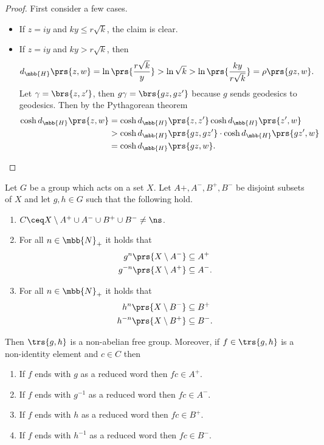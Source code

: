 \documentclass[10pt, twoside]{book}
\begin{document}
\begin{proof}
First consider a few cases.
\begin{itemize}
\item
If $z = iy$ and $ky \leq r \sqrt{k}$, the claim is clear.
\item
If $z = iy$ and $ky > r \sqrt{k}$, then \[d_{\mbb{H}}\prs{z,w} = \ln\prs{\frac{r\sqrt{k}}{y}} > \ln\sqrt{k} > \ln\prs{\frac{ky}{r \sqrt{k}}} = \rho\prs{gz, w} \text{.}\]
Let $\gamma = \brs{z,z'}$, then $g\gamma = \brs{gz, gz'}$ because $g$ sends geodesics to geodesics.
Then by the Pythagorean theorem
\begin{align*}
\cosh d_{\mbb{H}} \prs{z,w} &= \cosh d_{\mbb{H}}\prs{z,z'} \cosh d_{\mbb{H}}\prs{z',w}
\\&>
\cosh d_{\mbb{H}} \prs{gz, gz'} \cdot \cosh d_{\mbb{H}} \prs{gz', w}
\\&= \cosh d_{\mbb{H}}\prs{gz, w} \text{.}
\end{align*}
\end{itemize}
\end{proof}

\begin{lemma}
Let $G$ be a group which acts on a set $X$. Let $A+, A^-, B^+, B^-$ be disjoint subsets of $X$ and let $g,h \in G$ such that the following hold.
\begin{enumerate}
\item $C \ceq X \setminus A^+ \cup A^- \cup B^+ \cup B^- \neq \ns$.
\item For all $n \in \mbb{N}_+$ it holds that
\begin{align*}
g^n\prs{X \setminus A^-} &\subseteq A^+ \\
g^{-n}\prs{X \setminus A^+} &\subseteq A^- \text{.}
\end{align*}
\item For all $n \in \mbb{N}_+$ it holds that
\begin{align*}
h^n\prs{X \setminus B^-} &\subseteq B^+ \\
h^{-n}\prs{X \setminus B^+} &\subseteq B^- \text{.}
\end{align*}
\end{enumerate}
Then $\trs{g,h}$ is a non-abelian free group.
Moreover, if $f \in \trs{g,h}$ is a non-identity element and $c \in C$ then
\begin{enumerate}
\item If $f$ ends with $g$ as a reduced word then $fc \in A^+$.
\item If $f$ ends with $g^{-1}$ as a reduced word then $fc \in A^-$.
\item If $f$ ends with $h$ as a reduced word then $fc \in B^+$.
\item If $f$ ends with $h^{-1}$ as a reduced word then $fc \in B^-$.
\end{enumerate}
\end{lemma}
\end{document}
